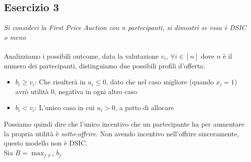 \documentclass{article}
\begin{document}
        \subsection{Esercizio 3}
            \textit{Si consideri la First Price Auction con n partecipanti, si dimostri se essa è DSIC o meno}\\
            \\
            Analizziamo i possibili outcome, data la valutazione $ v_i $, $ \forall i \in [n] $ dove $ n $ è il numero dei partecipanti, distinguiamo due possibili profili d'offerta:
            \begin{itemize}
                \item $ b_i \geq v_i$: Che risulterà in $ u_i \leq 0 $, dato che nel caso migliore (quando $ x_i = 1 $) avrò utilità 0, negativa in ogni altro caso
                \item $ b_i < v_i$: L'unico caso in cui $ u_i > 0 $, a patto di allocare  
            \end{itemize}
            Possiamo quindi dire che l'unico incentivo che un partecipante ha per aumentare la propria utilità è \textit{sotto-offrire}. Non avendo incentivo nell'offrire sinceramente, questo modello non è DSIC.\\
            Sia $ B = \max_{j \neq i} b_j $
\end{document}
